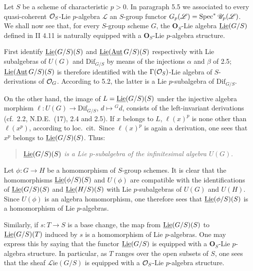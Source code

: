 Let $S$ be a scheme of characteristic $p>0$. In paragraph 5.5 we associated to every quasi-coherent $\mathcal{O}_S$-Lie $p$-algebra $\mathscr L$ an $S$-group functor $G_p(\mathscr L)=\operatorname{Spec}^*\mathscr U_p(\mathscr L)$. We shall now see that, for every $S$-group scheme $G$, the $\mathbf O_S$-Lie algebra $\underline{\operatorname{Lie}}(G/S)$ defined in II 4.11 is naturally equipped with a $\mathbf O_S$-Lie $p$-algebra structure.

First identify $\underline{\operatorname{Lie}}(G/S)(S)$ and $\underline{\operatorname{Lie}}(\underline{\operatorname{Aut}}\,G/S)(S)$ respectively with Lie subalgebras of $U(G)$ and $\mathrm{Dif}_{G/S}$ by means of the injections $\alpha$ and $\beta$ of 2.5; $\underline{\operatorname{Lie}}(\underline{\operatorname{Aut}}\,G/S)(S)$ is therefore identified with the $\Gamma(\mathcal{O}_S)$-Lie algebra of $S$-derivations of $\mathcal{O}_G$. According to 5.2, the latter is a Lie $p$-subalgebra of $\mathrm{Dif}_{G/S}$.

On the other hand, the image of $L=\underline{\operatorname{Lie}}(G/S)(S)$ under the injective algebra morphism $\ell:U(G)\to\mathrm{Dif}_{G/S}$, $d\mapsto{}^Gd$, consists of the left-invariant derivations (cf.\ 2.2, N.D.E.\ (17), 2.4 and 2.5). If $x$ belongs to $L$, $\ell(x)^p$ is none other than $\ell(x^p)$, according to loc.\ cit.\ Since $\ell(x)^p$ is again a derivation, one sees that $x^p$ belongs to $\underline{\operatorname{Lie}}(G/S)(S)$. Thus:
\begin{quote}\emph{$\underline{\operatorname{Lie}}(G/S)(S)$ is a Lie $p$-subalgebra of the infinitesimal algebra $U(G)$.}\end{quote}

Let $\phi:G\to H$ be a homomorphism of $S$-group schemes. It is clear that the homomorphisms $\underline{\operatorname{Lie}}(\phi/S)(S)$ and $U(\phi)$ are compatible with the identifications of $\underline{\operatorname{Lie}}(G/S)(S)$ and $\underline{\operatorname{Lie}}(H/S)(S)$ with Lie $p$-subalgebras of $U(G)$ and $U(H)$. Since $U(\phi)$ is an algebra homomorphism, one therefore sees that $\underline{\operatorname{Lie}}(\phi/S)(S)$ is a homomorphism of Lie $p$-algebras.

Similarly, if $s:T\to S$ is a base change, the map from $\underline{\operatorname{Lie}}(G/S)(S)$ to $\underline{\operatorname{Lie}}(G/S)(T)$ induced by $s$ is a homomorphism of Lie $p$-algebras. One may express this by saying that the functor $\underline{\operatorname{Lie}}(G/S)$ is equipped with a $\mathbf O_S$-Lie $p$-algebra structure. In particular, as $T$ ranges over the open subsets of $S$, one sees that the sheaf $\mathscr L\!\mathrm{ie}(G/S)$ is equipped with a $\mathcal{O}_S$-Lie $p$-algebra structure.

